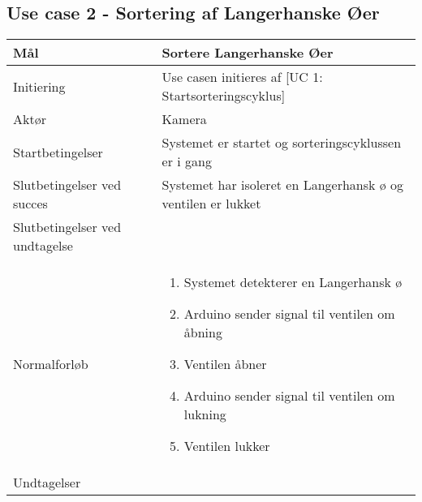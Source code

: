\subsection{Use case 2 - Sortering af Langerhanske Øer}
\label{uc:2}
\begin{center}
		\begin{longtable}{ | m{4cm} | m{8cm}| } 
			\hline
			Mål & Sortere Langerhanske Øer \\ 
			\hline
			Initiering &  Use casen initieres af [UC 1: Startsorteringscyklus]\\
			\hline
			Aktør & Kamera \\ 
			\hline
			Startbetingelser & Systemet er startet og sorteringscyklussen er i gang\\ 
			\hline	
			Slutbetingelser ved succes & Systemet har isoleret en Langerhansk ø og ventilen er lukket \\
			\hline
			Slutbetingelser ved undtagelse & \\
			\hline
			Normalforløb & \begin{enumerate}
				\item Systemet detekterer en Langerhansk ø
				\item Arduino sender signal til ventilen om åbning
				\item Ventilen åbner
				\item Arduino sender signal til ventilen om lukning
				\item Ventilen lukker
			\end{enumerate} \\ 
			\hline
			Undtagelser & \\
			\hline
		\end{longtable}
		
	\end{center}
	\pagebreak